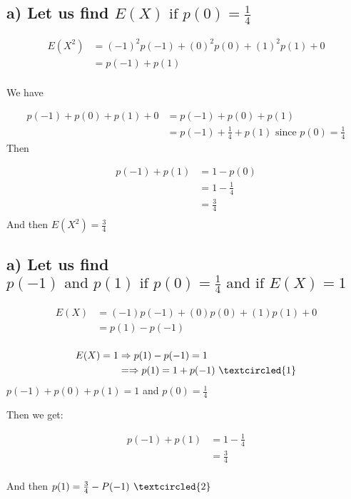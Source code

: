 \documentclass[11pt]{article}
\begin{document}
    \subsection{a) Let us find $E(X) \text{ if } p(0)=\frac{1}{4}$}
 \begin{align*}
  E(X^2) &= (-1)^2p(-1)+(0)^2p(0)+(1)^2p(1)+0 \\
       &=p(-1)+p(1) \\       
\end{align*}   

We have

\begin{align*}
  p(-1)+p(0)+p(1)+0 &= p(-1)+p(0)+p(1)\\ 
  					&= p(-1)+\frac{1}{4}+p(1)      \text{ since } p(0)= \frac{1}{4}
\end{align*}
Then 
 
\begin{align*}
  p(-1)+p(1) &= 1-p(0)\\ 
  			&= 1-\frac{1}{4}\\
  			&= \frac{3}{4}\\
\end{align*} 
And then $E(X^2)=\frac{3}{4}$ 

   \subsection{a) Let us find $p(-1)\text{ and } p(1) \text{ if } p(0)=\frac{1}{4} \text{ and if } E(X)= 1$}
   
  \begin{align*}
  E(X) &= (-1)p(-1)+(0)p(0)+(1)p(1)+0 \\
       &=p(1)-p(-1) \\       
\end{align*} 

\begin{align*}
  E(X)= 1 & \Rightarrow p(1)-p(-1)= 1\\
       &=\Rightarrow p(1)=1+p(-1) \text{ } \textcircled{1}      
\end{align*}
$p(-1)+p(0)+p(1)=1$ and $ p(0)=\frac{1}{4}$

Then we get:

\begin{align*}
  p(-1)+p(1) &=  1-\frac{1}{4}\\ 
 			 &= \frac{3}{4}\\    
\end{align*}

And then $p(1)=\frac{3}{4}-P(-1) \textbf{ } \textcircled{2} $
\end{document}

